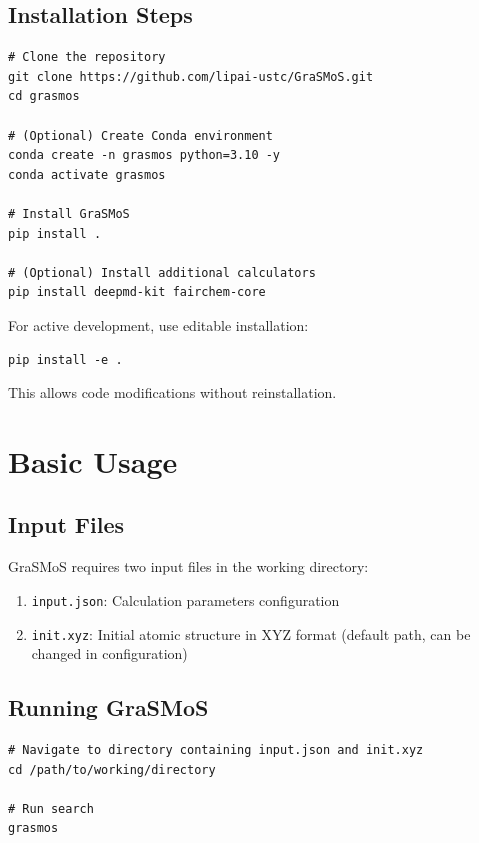 \documentclass[11pt,a4paper]{article}
\begin{document}
\subsection{Installation Steps}

\begin{lstlisting}[style=bashStyle, caption={Installation from source}]
# Clone the repository
git clone https://github.com/lipai-ustc/GraSMoS.git
cd grasmos

# (Optional) Create Conda environment
conda create -n grasmos python=3.10 -y
conda activate grasmos

# Install GraSMoS
pip install .

# (Optional) Install additional calculators
pip install deepmd-kit fairchem-core
\end{lstlisting}

\begin{tcolorbox}[colback=yellow!10,colframe=orange!50,title=Development Mode]
For active development, use editable installation:
\begin{lstlisting}[style=bashStyle]
pip install -e .
\end{lstlisting}
This allows code modifications without reinstallation.
\end{tcolorbox}

\section{Basic Usage}

\subsection{Input Files}
GraSMoS requires two input files in the working directory:

\begin{enumerate}
    \item \texttt{input.json}: Calculation parameters configuration
    \item \texttt{init.xyz}: Initial atomic structure in XYZ format (default path, can be changed in configuration)
\end{enumerate}

\subsection{Running GraSMoS}
\begin{lstlisting}[style=bashStyle, caption={Basic execution}]
# Navigate to directory containing input.json and init.xyz
cd /path/to/working/directory

# Run search
grasmos
\end{lstlisting}
\end{document}

